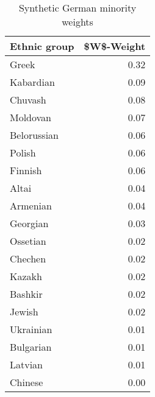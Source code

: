 \begin{table}[t]

\caption{\label{tab:sc_weights}Synthetic German minority weights}
\centering
\begin{tabular}{lr}
\toprule
Ethnic group & \$W\$-Weight\\
\midrule
Greek & 0.32\\
Kabardian & 0.09\\
Chuvash & 0.08\\
Moldovan & 0.07\\
Belorussian & 0.06\\
Polish & 0.06\\
Finnish & 0.06\\
Altai & 0.04\\
Armenian & 0.04\\
Georgian & 0.03\\
Ossetian & 0.02\\
Chechen & 0.02\\
Kazakh & 0.02\\
Bashkir & 0.02\\
Jewish & 0.02\\
Ukrainian & 0.01\\
Bulgarian & 0.01\\
Latvian & 0.01\\
Chinese & 0.00\\
\bottomrule
\end{tabular}
\end{table}